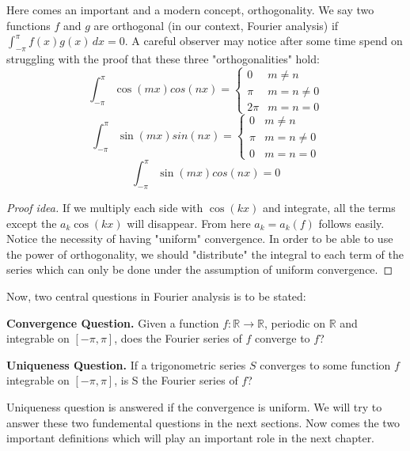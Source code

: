 \documentclass{article}
\theoremstyle{remark}
\theoremstyle{exercise}
\theoremstyle{definition}
\begin{document}
    Here comes an important and a modern concept, orthogonality\footnotemark{}. We say two functions $f$ and $g$ are orthogonal (in our context, Fourier analysis) if $\int_{-\pi}^{\pi} f(x)g(x)\,dx = 0$. A careful observer may notice after some time spend on struggling with the proof that these three "orthogonalities" hold:
    \[
    \int_{-\pi}^{\pi} \cos(mx)cos(nx) = \begin{cases}
                                        0 & m \neq n \\
                                      \pi &  m = n \neq 0\\
                                     2\pi & m = n = 0
                                        \end{cases}
    \]
    \[
    \int_{-\pi}^{\pi} \sin(mx)sin(nx) = \begin{cases}
                                        0 & m \neq n \\
                                      \pi &  m = n \neq 0\\
                                        0 & m = n = 0
                                        \end{cases}
    \]
    \[
    \int_{-\pi}^{\pi} \sin(mx)cos(nx) = 0
    \]

\begin{proof}[Proof idea]
    If we multiply each side with $\cos(kx)$ and integrate, all the terms except the $a_k \cos(kx)$ will disappear. From here $a_k = a_k(f)$ follows easily. \hfill
    \indent Notice the necessity of having "uniform" convergence. In order to be able to use the power of orthogonality, we should "distribute" the integral to each term of the series which can only be done under the assumption of uniform convergence.
\end{proof}
    Now, two central questions in Fourier analysis is to be stated:

\textbf{Convergence Question.} Given a function \( f : \mathbb{R} \to \mathbb{R} \), periodic on \( \mathbb{R} \) and integrable on \( [-\pi, \pi] \), does the Fourier series of \( f \) converge to \( f \)?

\textbf{Uniqueness Question.} If a trigonometric series \( S \) converges to some function \( f \) integrable on \( [-\pi, \pi] \), is S the Fourier series of \(f\)?

Uniqueness question is answered if the convergence is uniform. We will try to answer these two fundemental questions in the next sections. Now comes the two important definitions which will play an important role in the next chapter.\footnotemark{}
\end{document}
